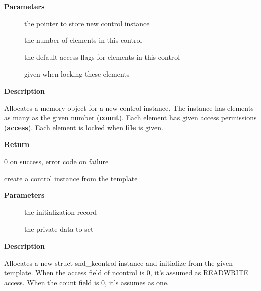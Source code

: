 \documentclass[a4paper,8pt,english]{sphinxmanual}
\begin{document}
\textbf{Parameters}
\begin{description}
\item[{}] \leavevmode
the pointer to store new control instance

\item[{}] \leavevmode
the number of elements in this control

\item[{}] \leavevmode
the default access flags for elements in this control

\item[{}] \leavevmode
given when locking these elements

\end{description}

\textbf{Description}

Allocates a memory object for a new control instance. The instance has
elements as many as the given number (\textbf{count}). Each element has given
access permissions (\textbf{access}). Each element is locked when \textbf{file} is given.

\textbf{Return}

0 on success, error code on failure

\begin{fulllineitems}
\label{sound/kernel-api/alsa-driver-api:c.snd_ctl_new1}
create a control instance from the template

\end{fulllineitems}


\textbf{Parameters}
\begin{description}
\item[{}] \leavevmode
the initialization record

\item[{}] \leavevmode
the private data to set

\end{description}

\textbf{Description}

Allocates a new struct snd\_kcontrol instance and initialize from the given
template.  When the access field of ncontrol is 0, it's assumed as
READWRITE access. When the count field is 0, it's assumes as one.
\end{document}
